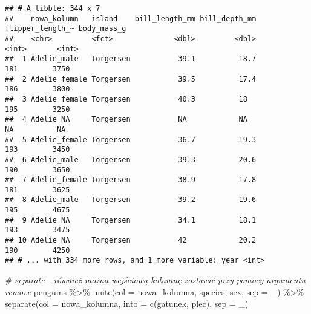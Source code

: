 \documentclass[
]{book}
\newenvironment{Shaded}{\begin{snugshade}}{\end{snugshade}}
\newcommand{\AttributeTok}[1]{\textcolor[rgb]{0.77,0.63,0.00}{#1}}
\newcommand{\CommentTok}[1]{\textcolor[rgb]{0.56,0.35,0.01}{\textit{#1}}}
\newcommand{\FunctionTok}[1]{\textcolor[rgb]{0.00,0.00,0.00}{#1}}
\newcommand{\NormalTok}[1]{#1}
\newcommand{\SpecialCharTok}[1]{\textcolor[rgb]{0.00,0.00,0.00}{#1}}
\newcommand{\StringTok}[1]{\textcolor[rgb]{0.31,0.60,0.02}{#1}}
\begin{document}
\begin{verbatim}
## # A tibble: 344 x 7
##    nowa_kolumn   island    bill_length_mm bill_depth_mm flipper_length_~ body_mass_g
##    <chr>         <fct>              <dbl>         <dbl>            <int>       <int>
##  1 Adelie_male   Torgersen           39.1          18.7              181        3750
##  2 Adelie_female Torgersen           39.5          17.4              186        3800
##  3 Adelie_female Torgersen           40.3          18                195        3250
##  4 Adelie_NA     Torgersen           NA            NA                 NA          NA
##  5 Adelie_female Torgersen           36.7          19.3              193        3450
##  6 Adelie_male   Torgersen           39.3          20.6              190        3650
##  7 Adelie_female Torgersen           38.9          17.8              181        3625
##  8 Adelie_male   Torgersen           39.2          19.6              195        4675
##  9 Adelie_NA     Torgersen           34.1          18.1              193        3475
## 10 Adelie_NA     Torgersen           42            20.2              190        4250
## # ... with 334 more rows, and 1 more variable: year <int>
\end{verbatim}

\begin{Shaded}
\begin{Highlighting}[]
\CommentTok{\# separate {-} również można wejściową kolumnę zostawić przy pomocy argumentu remove}
\NormalTok{penguins }\SpecialCharTok{\%\textgreater{}\%} \FunctionTok{unite}\NormalTok{(}\AttributeTok{col =}\NormalTok{ nowa\_kolumna, species, sex, }\AttributeTok{sep =} \StringTok{\textquotesingle{}\_\textquotesingle{}}\NormalTok{) }\SpecialCharTok{\%\textgreater{}\%}
  \FunctionTok{separate}\NormalTok{(}\AttributeTok{col =}\NormalTok{ nowa\_kolumna, }\AttributeTok{into =} \FunctionTok{c}\NormalTok{(}\StringTok{\textquotesingle{}gatunek\textquotesingle{}}\NormalTok{, }\StringTok{\textquotesingle{}plec\textquotesingle{}}\NormalTok{), }\AttributeTok{sep =} \StringTok{\textquotesingle{}\_\textquotesingle{}}\NormalTok{)}
\end{Highlighting}
\end{Shaded}
\end{document}
